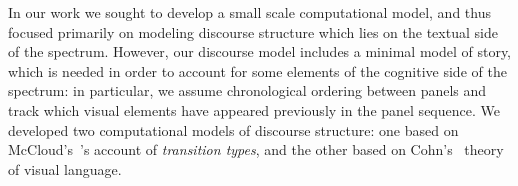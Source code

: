 %
%
%

%
In our work we sought to develop a small scale computational model, and thus
focused primarily on modeling discourse structure which lies on the textual
side of the spectrum. However, our discourse model includes a minimal model of
story, which is needed in order to account for some elements of the cognitive
side of the spectrum: in particular, we assume chronological ordering
between panels and track which visual elements have appeared previously in the
panel sequence.  We developed two computational models of discourse
structure: one based on McCloud's~\cite{mcCloud1993understanding}'s account
of \emph{transition types}, and the other based on
Cohn's~\cite{cohn2013visual} theory of visual language.



